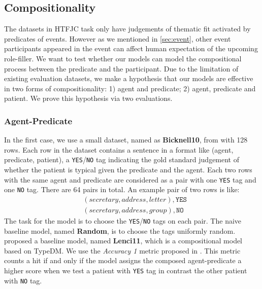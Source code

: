 \documentclass[a4paper]{article}
\begin{document}
\subsection{Compositionality}  \label{sec:compo}
The datasets in HTFJC task only have judgements of thematic fit activated by predicates of events. However as we mentioned in \ref{sec:event}, other event participants appeared in the event can affect human expectation of the upcoming role-filler. We want to test whether our models can model the compositional process between the predicate and the participant. Due to the limitation of existing evaluation datasets, we make a hypothesis that our models are effective in two forms of compositionality: 1) agent and predicate; 2) agent, predicate and patient. We prove this hypothesis via two evaluations. 


\subsubsection{Agent-Predicate} \label{sec:result-bicknell}
In the first case, we use a small dataset, named as \textbf{Bicknell10}, from \citet{bicknell2010effects} with 128 rows. Each row in the dataset contains a sentence in a format like (agent, predicate, patient), a \texttt{YES}/\texttt{NO} tag indicating the gold standard judgement of whether the patient is typical given the predicate and the agent. Each two rows with the same agent and predicate are considered as a pair with one \texttt{YES} tag and one \texttt{NO} tag. There are 64 pairs in total. An example pair of two rows is like: 
\begin{equation*} \label{eg:event-sim}
\begin{aligned}
    &(secretary, address, letter),  \texttt{YES} \\
    &(secretary, address, group),   \texttt{NO}  
\end{aligned}
\end{equation*}
The task for the model is to choose the \texttt{YES}/\texttt{NO} tags on each pair. The naive baseline model, named \textbf{Random}, is to choose the tags uniformly random. \citet{LenciECU} proposed a baseline model, named \textbf{Lenci11}, which is a compositional model based on TypeDM. We use the \textit{Accuracy 1} metric proposed in \citet{tilk2016event}. This metric counts a hit if and only if the model assigns the composed agent-predicate a higher score when we test a patient with \texttt{YES} tag in contrast the other patient with \texttt{NO} tag. 
\end{document}
